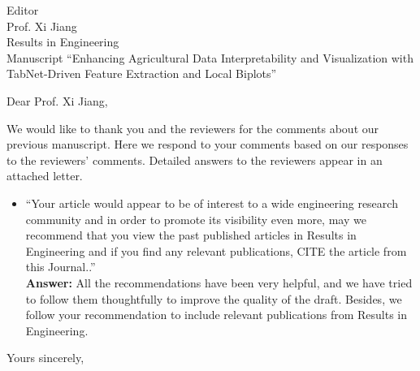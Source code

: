 \documentclass[11pt]{letter}
\begin{document}
\begin{letter}{Editor\\
Prof. Xi Jiang\\
Results in Engineering\\
Manuscript ``Enhancing Agricultural Data Interpretability and Visualization with TabNet-Driven Feature Extraction and Local Biplots''}
\opening{Dear Prof. Xi Jiang,}


We would like to thank you and the reviewers for the comments about our
previous manuscript. Here we respond to your comments based on our responses to the reviewers' comments. Detailed answers to the reviewers appear in an attached
letter. 

\begin{itemize}
\itemsep 0.5cm 
\item[--] ``Your article would appear to be of interest to a wide engineering research community and in order to promote its visibility even more, may we recommend that you view the past published articles in Results in Engineering and if you find any relevant publications, CITE the article from this Journal..''\\
 

\textbf{Answer:} All the recommendations have been very helpful, and we have tried to follow them thoughtfully to improve the quality of the draft. Besides, we follow your recommendation to include relevant publications from Results in Engineering. \\

\end{itemize}

\closing{Yours sincerely,}
\end{letter}
\end{document}
